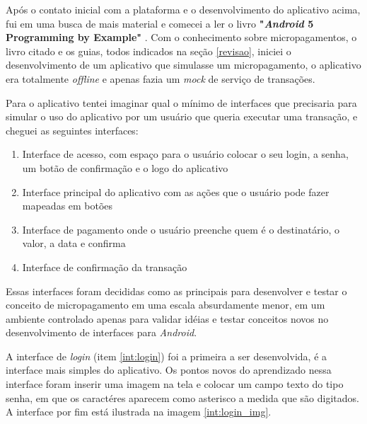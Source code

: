 \documentclass[hidelinks,12pt]{article}
\begin{document}
Ap\'os o contato inicial com a plataforma e o desenvolvimento do aplicativo acima, fui em uma busca de mais material e comecei a ler o livro \textbf{"\textit{{Android}} 5 Programming by Example"} \cite{andppe}. Com o conhecimento sobre micropagamentos, o livro citado e os guias, todos indicados na se\c{c}\~ao \ref{revisao}, iniciei o desenvolvimento de um aplicativo que simulasse um micropagamento, o aplicativo era totalmente \textit{offline} e apenas fazia um \textit{mock} de servi\c{c}o de transa\c{c}\~oes.

Para o aplicativo tentei imaginar qual o m\'inimo de interfaces que precisaria para simular o uso do aplicativo por um usu\'ario que queria executar uma transa\c{c}\~ao, e cheguei as seguintes interfaces:
\begin{enumerate}
	\item \label{int:login}Interface de acesso, com espa\c{c}o para o usu\'ario colocar o seu login, a senha, um bot\~ao de confirma\c{c}\~ao e o logo do aplicativo
	\item \label{int:main_list}Interface principal do aplicativo com as a\c{c}\~oes que o usu\'ario pode fazer mapeadas em bot\~oes
	\item \label{int:pay}Interface de pagamento onde o usu\'ario preenche quem \'e o destinat\'ario, o valor, a data e confirma
	\item \label{int:confirm}Interface de confirma\c{c}\~ao da transa\c{c}\~ao
\end{enumerate}
Essas interfaces foram decididas como as principais para desenvolver e testar o conceito de micropagamento em uma escala absurdamente menor, em um ambiente controlado apenas para validar id\'eias e testar conceitos novos no desenvolvimento de interfaces para \textit{Android}.

A interface de \textit{login} (item \ref{int:login}) foi a primeira a ser desenvolvida, \'e a interface mais simples do aplicativo. Os pontos novos do aprendizado nessa interface foram inserir uma imagem na tela e colocar um campo texto do tipo senha, em que os caract\'eres aparecem como asterisco a medida que s\~ao digitados. A interface por fim est\'a ilustrada na imagem \ref{int:login_img}.
\end{document}
